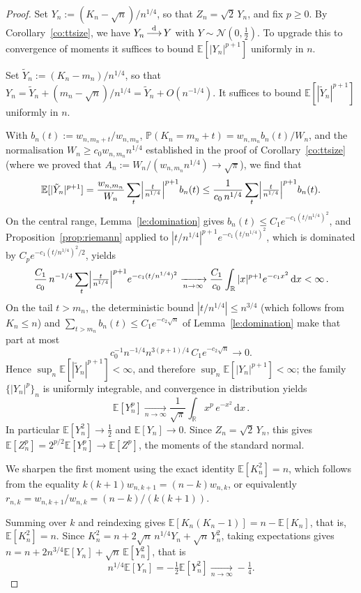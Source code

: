 \documentclass[english,11pt]{smfart}
\newcommand{\Prb}[1]{\mathbb{P}\left(#1\right)}
\newcommand{\Ex}[1]{\mathbb{E}[#1]}
\newcommand{\Exb}[1]{\mathbb{E}\left[#1\right]}
\newcommand{\convdis}{\,{\buildrel \mathrm{d} \over \longrightarrow}\,}
\newcommand{\cN}{\mathcal{N}}
\numberwithin{equation}{section}
\begin{document}
\begin{proof}
Set $Y_n:=(K_n-\sqrt n)/n^{1/4}$, so that $Z_n=\sqrt2\,Y_n$, and fix $p\ge0$. By
Corollary~\ref{co:ttsize}, we have $Y_n\convdis Y$ with $Y\sim\cN(0,\tfrac12)$. To upgrade
this to convergence of moments it suffices to bound $\Exb{|Y_n|^{p+1}}$ uniformly
in $n$.
\smallskip

Set $\tilde Y_n:=(K_n-m_n)/n^{1/4}$, so that
$Y_n=\tilde Y_n+(m_n-\sqrt n)/n^{1/4}=\tilde Y_n+O(n^{-1/4})$. It suffices to bound $\Ex{|\tilde Y_n|^{p+1}}$ uniformly in $n$.
\smallskip

With $b_n(t):=w_{n,m_n+t}/w_{n,m_n}$, 
$\Prb{K_n=m_n+t}=w_{n,m_n}b_n(t)/W_n$, and the normalisation
$W_n\ge c_0 w_{n,m_n}n^{1/4}$ established in the proof of
Corollary~\ref{co:ttsize} (where we proved that
$A_n:=W_n/(w_{n,m_n}n^{1/4})\to\sqrt{\pi}$), we find that 
\[
  \Ex{|\tilde Y_n|^{p+1}}
  =\frac{w_{n,m_n}}{W_n}\sum_{t}\Bigl|\tfrac{t}{n^{1/4}}\Bigr|^{p+1}b_n(t)
  \le\frac{1}{c_0\,n^{1/4}}\sum_{t}\Bigl|\tfrac{t}{n^{1/4}}\Bigr|^{p+1}b_n(t).
\]
On the central range, Lemma~\ref{le:domination} gives
$b_n(t)\le C_1 e^{-c_1(t/n^{1/4})^2}$, and Proposition~\ref{prop:riemann}
applied to $|t/n^{1/4}|^{p+1}e^{-c_1(t/n^{1/4})^2}$, which is dominated by
$C_p e^{-c_1(t/n^{1/4})^2/2}$, yields
\[
  \frac{C_1}{c_0}\,n^{-1/4}\sum_{t}\Bigl|\tfrac{t}{n^{1/4}}\Bigr|^{p+1}
  e^{-c_1(t/n^{1/4})^2}
  \xrightarrow[n\to\infty]{}
  \frac{C_1}{c_0}\int_{\mathbb R}|x|^{p+1}e^{-c_1 x^2}\,\mathrm dx<\infty\,.
\]
On the tail $t>m_n$, the deterministic bound $|t/n^{1/4}|\le n^{3/4}$
(which follows from $K_n\le n$) and $\sum_{t>m_n}b_n(t)\le C_1 e^{-c_2\sqrt n}$
of Lemma~\ref{le:domination} make that part at most
\[
  c_0^{-1}n^{-1/4}n^{3(p+1)/4}\,C_1 e^{-c_2\sqrt n}\to0.
\]
Hence $\sup_n\Ex{|\tilde Y_n|^{p+1}}<\infty$, and therefore
$\sup_n\Exb{|Y_n|^{p+1}}<\infty$; the family $\{|Y_n|^{p}\}_n$ is uniformly
integrable, and convergence in distribution yields
\[
  \Exb{Y_n^{p}}\xrightarrow[n\to\infty]{}
  \frac{1}{\sqrt\pi}\int_{\mathbb R}x^{p}\,e^{-x^2}\,\mathrm dx\,.
\]
In particular $\Exb{Y_n^{2}}\to\tfrac12$ and $\Exb{Y_n}\to0$. Since
$Z_n=\sqrt2\,Y_n$, this gives
$\Exb{Z_n^{p}}=2^{p/2}\Exb{Y_n^{p}}\to\Exb{Z^{p}}$, the moments of the standard
normal.
\smallskip

We sharpen the first moment using the exact identity $\Exb{K_n^{2}}=n$, which
follows from the equality $k(k+1)w_{n,k+1}=(n-k)w_{n,k}$, or equivalently
$r_{n,k}=w_{n,k+1}/w_{n,k}=(n-k)/(k(k+1))$. 
\smallskip


Summing over $k$ and reindexing gives
$\Exb{K_n(K_n-1)}=n-\Exb{K_n}$, that is, $\Exb{K_n^2}=n$. Since
$K_n^{2}=n+2\sqrt n\,n^{1/4}Y_n+\sqrt n\,Y_n^{2}$, taking expectations gives
$n=n+2n^{3/4}\Exb{Y_n}+\sqrt n\,\Exb{Y_n^{2}}$, that is
\[
  n^{1/4}\Exb{Y_n}=-\tfrac12\Exb{Y_n^{2}}\xrightarrow[n\to\infty]{}-\tfrac14 .
\]
\smallskip


\end{proof}
\end{document}
